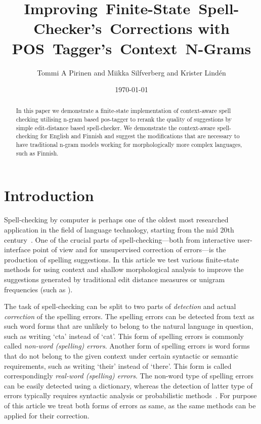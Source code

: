 \documentclass{llncs}
\begin{document}
\title{Improving~Finite-State~Spell-Checker's~Corrections with 
POS~Tagger's~Context~N-Grams}

\author{Tommi A Pirinen and Miikka Silfverberg and Krister Lind\'{e}n}


\date{\today}

\maketitle

\begin{abstract}
  In this paper we demonstrate a finite-state implementation of context-aware
  spell checking utilising n-gram based pos-tagger to rerank the
  quality of suggestions by simple edit-distance based spell-checker. We
  demonstrate the context-aware spell-checking for English and Finnish and
  suggest the modifications that are necessary to have traditional n-gram
  models working for morphologically more complex languages, such as Finnish.
\end{abstract}

\section{Introduction}

Spell-checking by computer is perhaps one of the oldest most researched
application in the field of language technology, starting from the mid 20th
century~\cite{damerau/1964}. One of the crucial parts of spell-checking---both
from interactive user-interface point of view and for unsupervised correction
of errors---is the production of spelling suggestions.  In this article we test
various finite-state methods for using context and shallow morphological
analysis to improve the suggestions generated by traditional edit distance
measures or unigram frequencies (such as \cite{pirinen/2010/lrec}).

The task of spell-checking can be split to two parts of \emph{detection} and
actual \emph{correction} of the spelling errors. The spelling errors can be
detected from text as such word forms that are unlikely to belong to the
natural language in question, such as writing `cta' instead of `cat'. This form
of spelling errors is commonly called \emph{non-word (spelling) errors}.
Another form of spelling errors is word forms that do not belong to the given
context under certain syntactic or semantic requirements, such as writing
`their' instead of `there'. This form is called correspondingly \emph{real-word
(spelling) errors}. The non-word type of spelling errors can be easily detected
using a dictionary, whereas the detection of latter type of errors typically
requires syntactic analysis or probabilistic methods~\cite{mitton/2009}. For
purpose of this article we treat both forms of errors as same, as the same
methods can be applied for their correction.
\end{document}
